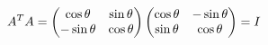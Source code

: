 \documentclass[preview]{standalone}
\begin{document}
\begin{align*}
\special{dvisvgm:raw <g id='unique000'>}A^TA=\begin{pmatrix} \cos\theta & \sin\theta \\ -\sin\theta & \cos\theta \end{pmatrix}\begin{pmatrix} \cos\theta & -\sin\theta \\ \sin\theta & \cos\theta \end{pmatrix}=I\special{dvisvgm:raw </g>}
\end{align*}
\end{document}
